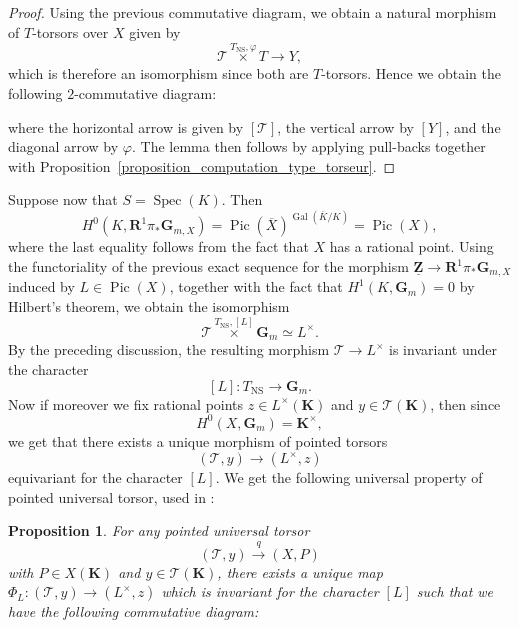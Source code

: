 \documentclass{proc-l}
\newcommand{\R}{\mathbf{R}}
\newcommand{\Z}{\mathbf{Z}}
\newcommand{\K}{\mathbf{K}}
\newcommand{\G}{\mathbf{G}}
\DeclareMathOperator{\Spec}{Spec}
\DeclareMathOperator{\Gal}{Gal}
\DeclareMathOperator{\Pic}{Pic}
\DeclareMathOperator{\NS}{NS}
\newcommand{\stackT}{\mathcal{T}}
\newtheorem{prop}[theorem]{Proposition}
\theoremstyle{definition}
\theoremstyle{remark}
\numberwithin{equation}{section}
\begin{document}
\begin{proof}
Using the previous commutative diagram, we obtain a natural morphism of $T$-torsors over $X$ given by
$$ \stackT \overset{T_{\NS},\varphi}{\times} T \longrightarrow Y,$$
which is therefore an isomorphism since both are $T$-torsors. Hence we obtain the following $2$-commutative diagram:
\begin{center}
\end{center}
where the horizontal arrow is given by $[\stackT]$, the vertical arrow by $[Y]$, and the diagonal arrow by $\varphi$. The lemma then follows by applying pull-backs together with Proposition~\ref{proposition_computation_type_torseur}.
\end{proof}


Suppose now that $S = \Spec(K)$. Then
$$H^0(K,\R^1 \pi_* \G_{m,X}) = \Pic(\overline{X})^{\Gal(\overline{K}/K)} = \Pic(X),$$
where the last equality follows from the fact that $X$ has a rational point. Using the functoriality of the previous exact sequence for the morphism $\underline{\Z} \rightarrow \R^1 \pi_* \G_{m,X}$ induced by $L \in \Pic(X)$, together with the fact that $H^1(K,\G_m)=0$ by Hilbert's theorem, we obtain the isomorphism
$$\stackT \overset{T_{\NS},[L]}{\times} \G_{m} \simeq L^{\times}.$$
By the preceding discussion, the resulting morphism $\stackT \rightarrow L^{\times}$ is invariant under the character $$[L] : T_{\NS} \rightarrow \G_m .$$Now if moreover we fix rational points $z \in L^{\times}(\K)$ and $y \in \stackT(\K)$, then since $$H^0(X,\G_m) = \K^{\times} ,$$ we get that there exists a unique morphism of pointed torsors $$(\stackT,y) \longrightarrow (L^{\times},z)$$ equivariant for the character $[L]$. We get the following universal property of pointed universal torsor, used in \cite[section 4.3.1]{Peyre_beyond_height}:

\begin{prop}\label{proposition_universal_property_of_pointed_versal_torsor}
For any pointed universal torsor $$(\stackT,y) \xrightarrow{q} (X,P)$$ with $P \in X(\K)$ and $y \in \stackT(\K)$, there exists a unique map $\Phi_L : (\stackT,y) \rightarrow (L^{\times},z)$ which is invariant for the character $[L]$ such that we have the following commutative diagram:
\begin{center}
\end{center}
\end{prop}
\end{document}
